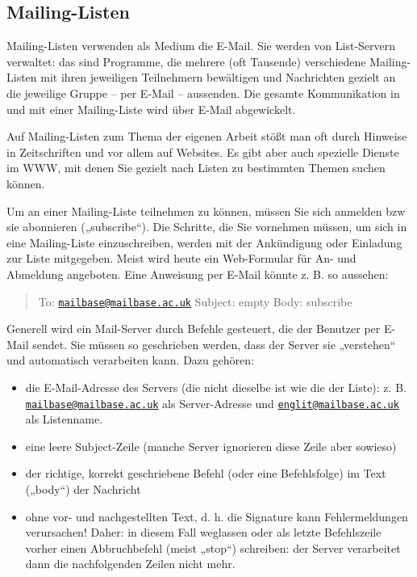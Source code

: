 \documentclass[]{book}
\providecommand{\tightlist}{%
  \setlength{\itemsep}{0pt}\setlength{\parskip}{0pt}}
\theoremstyle{definition}
\theoremstyle{definition}
\theoremstyle{definition}
\theoremstyle{remark}
\begin{document}
\subsection{Mailing-Listen}\label{mailing-listen}

Mailing-Listen verwenden als Medium die E-Mail. Sie werden von
List-Servern verwaltet: das sind Programme, die mehrere (oft Tausende)
verschiedene Mailing-Listen mit ihren jeweiligen Teilnehmern bewältigen
und Nachrichten gezielt an die jeweilige Gruppe -- per E-Mail --
aussenden. Die gesamte Kommunikation in und mit einer Mailing-Liste wird
über E-Mail abgewickelt.

Auf Mailing-Listen zum Thema der eigenen Arbeit stößt man oft durch
Hinweise in Zeitschriften und vor allem auf Websites. Es gibt aber auch
spezielle Dienste im WWW, mit denen Sie gezielt nach Listen zu
bestimmten Themen suchen können.

Um an einer Mailing-Liste teilnehmen zu können, müssen Sie sich anmelden
bzw sie abonnieren („subscribe``). Die Schritte, die Sie vornehmen
müssen, um sich in eine Mailing-Liste einzuschreiben, werden mit der
Ankündigung oder Einladung zur Liste mitgegeben. Meist wird heute ein
Web-Formular für An- und Abmeldung angeboten. Eine Anweisung per E-Mail
könnte z. B. so aussehen:

\begin{quote}
To:
\href{mailto:mailbase@mailbase.ac.uk}{\nolinkurl{mailbase@mailbase.ac.uk}}
Subject: empty Body: subscribe
\end{quote}

Generell wird ein Mail-Server durch Befehle gesteuert, die der Benutzer
per E-Mail sendet. Sie müssen so geschrieben werden, dass der Server sie
„verstehen`` und automatisch verarbeiten kann. Dazu gehören:

\begin{itemize}
\tightlist
\item
  die E-Mail-Adresse des Servers (die nicht dieselbe ist wie die der
  Liste): z. B.
  \href{mailto:mailbase@mailbase.ac.uk}{\nolinkurl{mailbase@mailbase.ac.uk}}
  als Server-Adresse und
  \href{mailto:englit@mailbase.ac.uk}{\nolinkurl{englit@mailbase.ac.uk}}
  als Listenname.
\item
  eine leere Subject-Zeile (manche Server ignorieren diese Zeile aber
  sowieso)
\item
  der richtige, korrekt geschriebene Befehl (oder eine Befehlsfolge) im
  Text („body``) der Nachricht
\item
  ohne vor- und nachgestellten Text, d. h. die Signature kann
  Fehlermeldungen verursachen! Daher: in diesem Fall weglassen oder als
  letzte Befehlszeile vorher einen Abbruchbefehl (meist „stop``)
  schreiben: der Server verarbeitet dann die nachfolgenden Zeilen nicht
  mehr.
\end{itemize}
\end{document}
